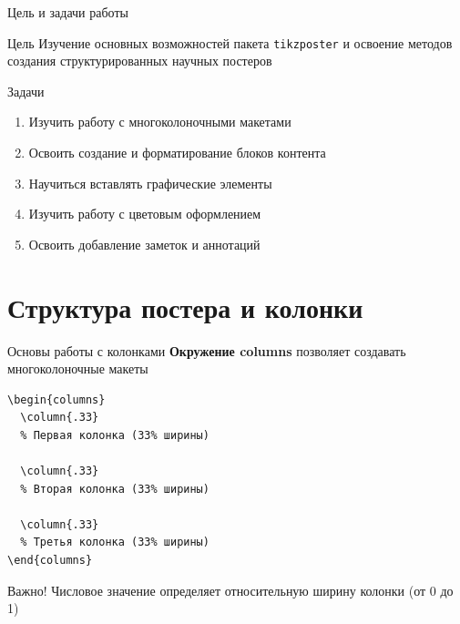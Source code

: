 \documentclass[aspectratio=169]{beamer}
\begin{document}
\begin{frame}{Цель и задачи работы}
    \begin{block}{Цель}
        Изучение основных возможностей пакета \texttt{tikzposter} и освоение методов создания структурированных научных постеров
    \end{block}
    
    \vspace{0.3cm}
    
    \begin{block}{Задачи}
        \begin{enumerate}
            \item Изучить работу с многоколоночными макетами
            \item Освоить создание и форматирование блоков контента
            \item Научиться вставлять графические элементы
            \item Изучить работу с цветовым оформлением
            \item Освоить добавление заметок и аннотаций
        \end{enumerate}
    \end{block}
\end{frame}

\section{Структура постера и колонки}

\begin{frame}[fragile]{Основы работы с колонками}
    \textbf{Окружение columns} позволяет создавать многоколоночные макеты
    
    \vspace{0.3cm}
    
    \begin{lstlisting}
\begin{columns}
  \column{.33}
  % Первая колонка (33% ширины)
  
  \column{.33}
  % Вторая колонка (33% ширины)
  
  \column{.33}
  % Третья колонка (33% ширины)
\end{columns}
    \end{lstlisting}
    
    \vspace{0.3cm}
    
    \begin{alertblock}{Важно!}
        Числовое значение определяет относительную ширину колонки (от 0 до 1)
    \end{alertblock}
\end{frame}
\end{document}
